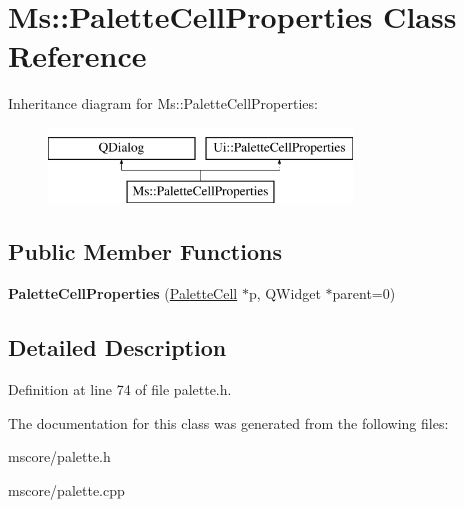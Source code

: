 \hypertarget{class_ms_1_1_palette_cell_properties}{}\section{Ms\+:\+:Palette\+Cell\+Properties Class Reference}
\label{class_ms_1_1_palette_cell_properties}
Inheritance diagram for Ms\+:\+:Palette\+Cell\+Properties\+:\begin{figure}[H]
\begin{center}
\leavevmode
\includegraphics[height=2.000000cm]{class_ms_1_1_palette_cell_properties}
\end{center}
\end{figure}
\subsection*{Public Member Functions}
\begin{DoxyCompactItemize}
\item 
\mbox{\label{class_ms_1_1_palette_cell_properties_af2ed48040e8779280796dddc4499d6d1}} 
{\bfseries Palette\+Cell\+Properties} (\hyperlink{struct_ms_1_1_palette_cell}{Palette\+Cell} $\ast$p, Q\+Widget $\ast$parent=0)
\end{DoxyCompactItemize}


\subsection{Detailed Description}


Definition at line 74 of file palette.\+h.



The documentation for this class was generated from the following files\+:\begin{DoxyCompactItemize}
\item 
mscore/palette.\+h\item 
mscore/palette.\+cpp\end{DoxyCompactItemize}
